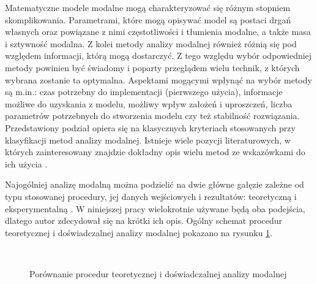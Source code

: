 Matematyczne modele modalne mogą charakteryzować się różnym stopniem skomplikowania. Parametrami, które mogą opisywać model są postaci drgań własnych oraz powiązane z nimi częstotliwości i tłumienia modalne, a także masa i sztywność modalna. Z kolei metody analizy modalnej również różnią się pod względem informacji, którą mogą dostarczyć. Z tego względu wybór odpowiedniej metody powinien być świadomy i poparty przeglądem wielu technik, z których wybrana zostanie ta optymalna. Aspektami mogącymi wpłynąć na wybór metody są m.in.: czas potrzebny do implementacji (pierwszego użycia), informacje możliwe do uzyskania z modelu, możliwy wpływ założeń i uproszczeń, liczba parametrów potrzebnych do stworzenia modelu czy też stabilność rozwiązania. Przedstawiony podział opiera się na klasycznych kryteriach stosowanych przy klasyfikacji metod analizy modalnej. Istnieje wiele pozycji literaturowych, w których zainteresowany znajdzie dokładny opis wielu metod ze wskazówkami do ich użycia \parencite{Ewins2000,Maia1997,Zhang2004,Brincker2015,Rainieri2014}. 

Najogólniej analizę modalną można podzielić na dwie główne gałęzie zależne od typu stosowanej procedury, jej danych wejściowych i rezultatów: teoretyczną i eksperymentalną \parencite{Lengvarsky2013}. W niniejszej pracy wielokrotnie używane będą oba podejścia, dlatego autor zdecydował się na krótki ich opis. Ogólny schemat procedur teoretycznej i doświadczalnej analizy modalnej pokazano na rysunku \ref{fig:theExpProc}.  

\begin{figure}[h]
	\centering
	 \\
	\captionsetup{justification=centering}
	\caption{Porównanie procedur teoretycznej i doświadczalnej analizy modalnej}
	\label{fig:theExpProc}
\end{figure}

